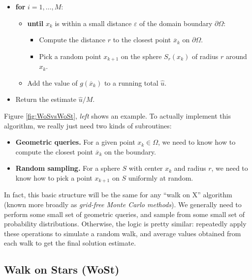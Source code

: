 \documentclass{article}
\newcommand{\figloc}[1]{\textit{#1}}
\renewcommand{\vec}[1]{#1}
\begin{document}
\begin{itemize}
   \item \textbf{for} \(i = 1, \ldots, M\):
\begin{itemize}
   \item \textbf{until} \(\vec{x}_k\) is within a small distance \(\varepsilon\) of the domain boundary \(\partial\Omega\):
      \begin{itemize}
         \item Compute the distance \(r\) to the closest point \(\overline{\vec{x}}_k\) on \(\partial\Omega\).
         \item Pick a random point \(\vec{x}_{k+1}\) on the sphere \(S_r(\vec{x}_k)\) of radius \(r\) around \(\vec{x}_k\).
      \end{itemize}
   \item Add the value of \(g(\overline{\vec{x}}_k)\) to a running total \(\widehat{u}\).
\end{itemize}
   \item Return the estimate \(\widehat{u}/M\).
\end{itemize}

Figure \ref{fig:WoSvsWoSt}, \figloc{left} shows an example.  To actually implement this algorithm, we really just need two kinds of subroutines:
\begin{itemize}
   \item \textbf{Geometric queries.}  For a given point \(\vec{x}_k \in \Omega\), we need to know how to compute the closest point \(\overline{\vec{x}}_k\) on the boundary.
   \item \textbf{Random sampling.} For a sphere \(S\) with center \(\vec{x}_k\) and radius \(r\), we need to know how to pick a point \(\vec{x}_{k+1}\) on \(S\) uniformly at random.
\end{itemize}

In fact, this basic structure will be the same for any ``walk on X'' algorithm (known more broadly as \emph{grid-free Monte Carlo methods}).  We generally need to perform some small set of geometric queries, and sample from some small set of probability distributions.  Otherwise, the logic is pretty similar: repeatedly apply these operations to simulate a random walk, and average values obtained from each walk to get the final solution estimate.


\subsection{Walk on Stars (WoSt)}
\label{sec:WalkOnStarsOverview}
\end{document}
